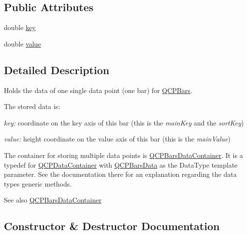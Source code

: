 \subsection*{Public Attributes}
\begin{DoxyCompactItemize}
\item 
double \mbox{\hyperlink{class_q_c_p_bars_data_a09b492217dc03ee1c0348a2f2e6e0a04}{key}}
\item 
double \mbox{\hyperlink{class_q_c_p_bars_data_ab636644fb40630f3b1b72f44d65ec072}{value}}
\end{DoxyCompactItemize}


\subsection{Detailed Description}
Holds the data of one single data point (one bar) for \mbox{\hyperlink{class_q_c_p_bars}{Q\+C\+P\+Bars}}. 

The stored data is\+: \begin{DoxyItemize}
\item {\itshape key\+:} coordinate on the key axis of this bar (this is the {\itshape main\+Key} and the {\itshape sort\+Key}) \item {\itshape value\+:} height coordinate on the value axis of this bar (this is the {\itshape main\+Value})\end{DoxyItemize}
The container for storing multiple data points is \mbox{\hyperlink{qcustomplot_8h_a52bf589c9fce1baa36c1d40d69785d46}{Q\+C\+P\+Bars\+Data\+Container}}. It is a typedef for \mbox{\hyperlink{class_q_c_p_data_container}{Q\+C\+P\+Data\+Container}} with \mbox{\hyperlink{class_q_c_p_bars_data}{Q\+C\+P\+Bars\+Data}} as the Data\+Type template parameter. See the documentation there for an explanation regarding the data type\textquotesingle{}s generic methods.

\begin{DoxySeeAlso}{See also}
\mbox{\hyperlink{qcustomplot_8h_a52bf589c9fce1baa36c1d40d69785d46}{Q\+C\+P\+Bars\+Data\+Container}} 
\end{DoxySeeAlso}


\subsection{Constructor \& Destructor Documentation}
\mbox{\label{class_q_c_p_bars_data_a800794d4c5fea22eeb8bade20798496b}} 
